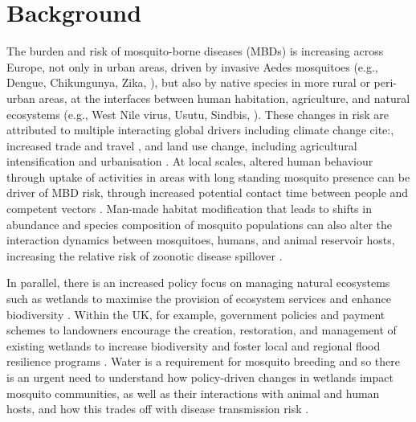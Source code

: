 \documentclass[lineno,sn-basic]{sn-jnl}%
\begin{document}
\maketitle

\section{Background}\label{sec1}

The burden and risk of mosquito-borne diseases (MBDs) is increasing across Europe, not only in urban areas, driven by invasive Aedes mosquitoes (e.g., Dengue, Chikungunya, Zika, \cite{medlockReviewInvasiveMosquitoes2012}), but also by native species in more rural or peri-urban areas, at the interfaces between human habitation, agriculture, and natural ecosystems (e.g., West Nile virus, Usutu, Sindbis, \cite{buckleySerologicalEvidenceWest2003, chengEvaluatingRiskUsutu2018}). These changes in risk are attributed to multiple interacting global drivers including climate change cite:\citep{bruguerasEnvironmentalDriversClimate2020}, increased trade and travel \citep{benelliAedesAlbopictusAsian2020, kilpatrickGlobalizationLandUse2011}, and land use change, including agricultural intensification and urbanisation \citep{gottdenkerAnthropogenicLandUse2014, meyersteigerMosquitoCommunitiesDisease2016, townroeBritishContainerBreeding2014}. At local scales, altered human behaviour through uptake of activities in areas with long standing mosquito presence can be driver of MBD risk, through increased potential contact time between people and competent vectors \citep{lambinPathogenicLandscapesInteractions2010}. Man-made habitat modification that leads to shifts in abundance and species composition of mosquito populations can also alter the interaction dynamics between mosquitoes, humans, and animal reservoir hosts, increasing the relative risk of zoonotic disease spillover \citep{meyersteigerMosquitoCommunitiesDisease2016}.

In parallel, there is an increased policy focus on managing natural ecosystems such as wetlands to maximise the provision of ecosystem services and enhance biodiversity \cite{acremanTradeoffEcosystemServices2011, defraCountrysideStewardshipGet2023, gibbsWetlandLossBiodiversity2000}. Within the UK, for example, government policies and payment schemes to landowners encourage the creation, restoration, and management of existing wetlands to increase biodiversity and foster local and regional flood resilience programs \citep{defra25YearEnvironment2023, defraCountrysideStewardshipGet2023, defraThirdNationalAdaptation2023a}. Water is a requirement for mosquito breeding and so there is an urgent need to understand how policy-driven changes in wetlands impact mosquito communities, as well as their interactions with animal and human hosts, and how this trades off with disease transmission risk \citep{daleWetlandsMosquitoesReview2008,martinouCallArmsSetting2020,medlockImpactsCreationExpansion2015, hanfordManagementUrbanWetlands2020}. 
\end{document}
